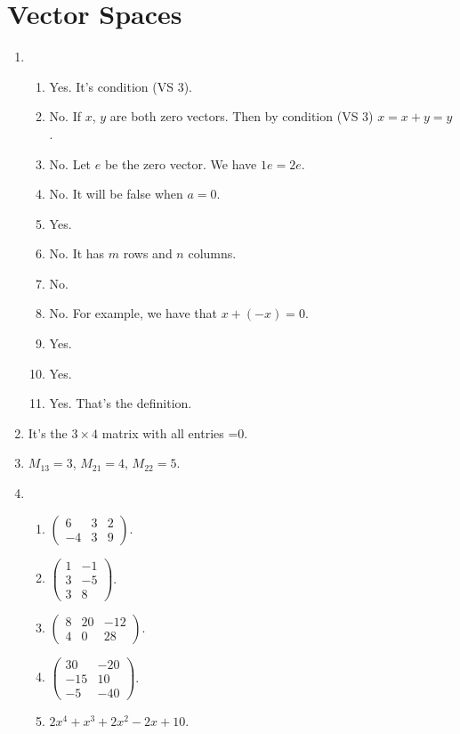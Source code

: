 \section{Vector Spaces}
\begin{enumerate}
\item
\begin{enumerate}
\item Yes. It's condition (VS 3).
\item No. If $x$, $y$ are both zero vectors. Then by condition (VS 3) $x=x+y=y$.
\item No. Let $e$ be the zero vector. We have $1e=2e$.
\item No. It will be false when $a=0$.
\item Yes.
\item No. It has $m$ rows and $n$ columns.
\item No.
\item No. For example, we have that $x+(-x)=0$.
\item Yes.
\item Yes.
\item Yes. That's the definition.
\end{enumerate}
\item It's the $3\times 4$ matrix with all entries =0.
\item $M_{13}=3$, $M_{21}=4$, $M_{22}=5$.
\item 
\begin{enumerate}
\item \(
\left( \begin{array}{ccc}
6& 3& 2\\
-4& 3& 9
\end{array}\right)
\).
\item \(
\left( \begin{array}{cc}
1& -1\\
3& -5\\
3& 8
\end{array}\right)
\).
\item \(
\left( \begin{array}{ccc}
8& 20& -12\\
4& 0& 28
\end{array}\right)
\).
\item \(
\left( \begin{array}{cc}
30& -20\\
-15& 10\\
-5& -40
\end{array}\right)
\).
\item $2x^4+x^3+2x^2-2x+10$.

\end{enumerate}
\end{enumerate}
